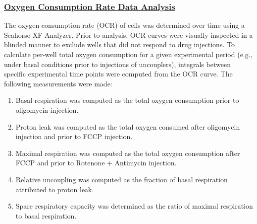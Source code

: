 \subsubsection{\underline{Oxygen Consumption Rate Data Analysis}}
The oxygen consumption rate (OCR) of cells was determined over time using a Seahorse XF Analyzer. Prior to analysis, OCR curves were visually inspected in a blinded manner to exclude wells that did not respond to drug injections. To calculate per-well total oxygen consumption for a given experimental period (e.g., under basal conditions prior to injections of uncouplers), integrals between specific experimental time points were computed from the OCR curve. The following measurements were made:
\begin{enumerate}
    \item Basal respiration was computed as the total oxygen consumption prior to oligomycin injection.
    \item Proton leak was computed as the total oxygen consumed after oligomycin injection and prior to FCCP injection.
    \item Maximal respiration was computed as the total oxygen consumption after FCCP and prior to Rotenone + Antimycin injection.
    \item Relative uncoupling was computed as the fraction of basal respiration attributed to proton leak.
    \item Spare respiratory capacity was determined as the ratio of maximal respiration to basal respiration.
\end{enumerate}